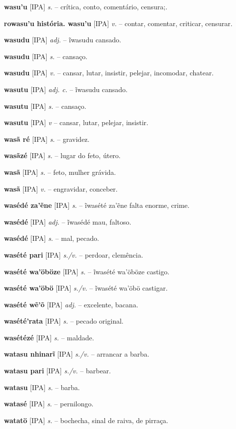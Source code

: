 \textbf{wasu'u} [IPA] \textit{s.} -- crítica, conto, comentário, censura;.

\textbf{rowasu'u história. wasu'u} [IPA] \textit{v.} -- contar, comentar, criticar, censurar.

\textbf{wasudu} [IPA] \textit{adj.} -- ĩwasudu cansado.

\textbf{wasudu} [IPA] \textit{s.} -- cansaço.

\textbf{wasudu} [IPA] \textit{v.} -- cansar, lutar, insistir, pelejar, incomodar, chatear.

\textbf{wasutu} [IPA] \textit{adj. c.} -- ĩwasudu cansado.

\textbf{wasutu} [IPA] \textit{s.} -- cansaço.

\textbf{wasutu} [IPA] \textit{v} -- cansar, lutar, pelejar, insistir.

\textbf{wasã ré} [IPA] \textit{s.} -- gravidez.

\textbf{wasãzé} [IPA] \textit{s.} -- lugar do feto, útero.

\textbf{wasã} [IPA] \textit{s.} -- feto, mulher grávida.

\textbf{wasã} [IPA] \textit{v.} -- engravidar, conceber.

\textbf{wasédé za'ẽne} [IPA] \textit{s.} -- ĩwasété za'ẽne falta enorme, crime.

\textbf{wasédé} [IPA] \textit{adj.} -- ĩwasédé mau, faltoso.

\textbf{wasédé} [IPA] \textit{s.} -- mal, pecado.

\textbf{wasété pari} [IPA] \textit{s./v.} -- perdoar, clemência.

\textbf{wasété wa'öböze} [IPA] \textit{s.} -- ĩwasété wa'öböze castigo.

\textbf{wasété wa'öbö} [IPA] \textit{s./v.} -- ĩwasété wa'öbö castigar.

\textbf{wasété wẽ'õ} [IPA] \textit{adj.} -- excelente, bacana.

\textbf{wasété'rata} [IPA] \textit{s.} -- pecado original.

\textbf{wasétézé} [IPA] \textit{s.} -- maldade.

\textbf{watasu nhinarĩ} [IPA] \textit{s./v.} -- arrancar a barba.

\textbf{watasu pari} [IPA] \textit{s./v.} -- barbear.

\textbf{watasu} [IPA] \textit{s.} -- barba.

\textbf{watasé} [IPA] \textit{s.} -- pernilongo.

\textbf{watatö} [IPA] \textit{s.} -- bochecha, sinal de raiva, de pirraça.

